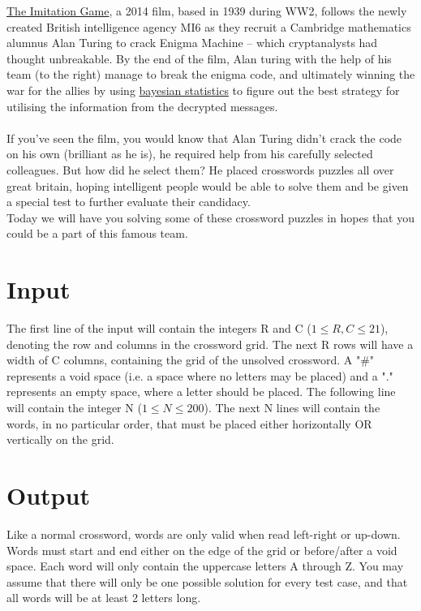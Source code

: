 

\noindent \href{https://www.imdb.com/title/tt2084970/}{The Imitation Game}, a 2014 film, 
based in 1939 during WW2, follows the newly created British intelligence agency MI6 as they 
recruit a Cambridge mathematics alumnus Alan Turing to crack Enigma Machine -- 
which cryptanalysts had thought unbreakable. By the end of the film, 
Alan turing with the help of his team (to the right) manage to break the enigma code, 
and ultimately winning the war for the allies by using 
\href{https://rss.onlinelibrary.wiley.com/doi/pdf/10.1111/j.1740-9713.2010.00424.x}{bayesian statistics} to figure 
out the best strategy for utilising the information from the decrypted messages. \\
\\

\noindent If you've seen the film, you would know that Alan Turing didn't crack the code on his own (brilliant as he is), he required help from his carefully selected colleagues. 
But how did he select them? He placed crosswords puzzles all over great britain, hoping intelligent people would be able to solve them and be given a special test to further evaluate their candidacy.  \\


\noindent Today we will have you solving some of these crossword puzzles in hopes that you could be a part of this famous team. \\

\section*{Input}

The first line of the input will contain the integers R and C ($1 \leq R,C \leq 21$), denoting the row and columns in the crossword grid. 
The next R rows will have a width of C columns, containing the grid of the unsolved crossword. 
A "\#" represents a void space (i.e. a space where no letters may be placed) and a "." 
represents an empty space, where a letter should be placed. The following line will contain the integer N ($1 \leq N \leq 200$). 
The next N lines will contain the words, in no particular order, that must be placed either horizontally OR vertically on the grid.


\section*{Output}
Like a normal crossword, words are only valid when read left-right or up-down. 
Words must start and end either on the edge of the grid or before/after a void space. 
Each word will only contain the uppercase letters A through Z. You may assume that there will only be one possible
solution for every test case, and that all words will be at least 2 letters long.
